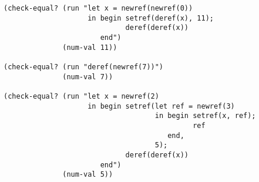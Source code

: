\documentclass{article}
\begin{document}
\begin{lstlisting}
(check-equal? (run "let x = newref(newref(0))
                    in begin setref(deref(x), 11);
                             deref(deref(x))
                       end")
              (num-val 11))

(check-equal? (run "deref(newref(7))")
              (num-val 7))

(check-equal? (run "let x = newref(2)
                    in begin setref(let ref = newref(3)
                                    in begin setref(x, ref);
                                             ref
                                       end,
                                    5);
                             deref(deref(x))
                       end")
              (num-val 5))
\end{lstlisting}
\end{document}
